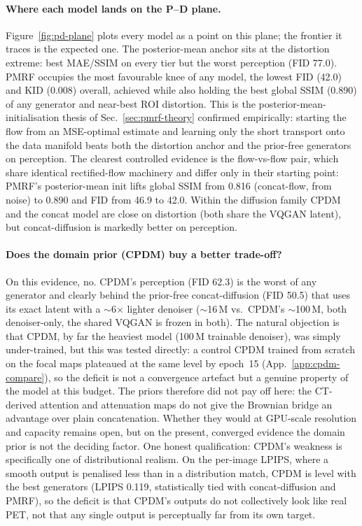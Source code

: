 \documentclass[11pt,a4paper]{article}
\newcommand{\num}[1]{#1}
\begin{document}
\paragraph{Where each model lands on the P--D plane.} Figure~\ref{fig:pd-plane} plots every model
as a point on this plane; the frontier it traces is the expected one.
The posterior-mean anchor sits at the distortion extreme: best MAE/SSIM on every tier but the
worst perception (FID \num{77.0}). PMRF occupies the most favourable knee of any
model, the lowest FID (\num{42.0}) and KID (\num{0.008}) overall, achieved while also holding
the best global SSIM (\num{0.890}) of any generator and near-best ROI distortion. This is
the posterior-mean-initialisation thesis of Sec.~\ref{sec:pmrf-theory} confirmed empirically:
starting the flow from an MSE-optimal estimate and learning only the short transport onto the
data manifold beats both the distortion anchor and the prior-free generators on perception. The
clearest controlled evidence is the flow-vs-flow pair, which share identical rectified-flow
machinery and differ only in their starting point: PMRF's posterior-mean init lifts
global SSIM from \num{0.816} (concat-flow, from noise) to \num{0.890} and FID from \num{46.9}
to \num{42.0}. Within the diffusion family CPDM and the concat model are close on distortion
(both share the VQGAN latent), but concat-diffusion is markedly better on perception.

\paragraph{Does the domain prior (CPDM) buy a better trade-off?} On this evidence, no.
CPDM's perception (FID \num{62.3}) is the worst of any generator and clearly behind the
prior-free concat-diffusion (FID \num{50.5}) that uses its exact latent with a $\sim$6$\times$
lighter denoiser ($\sim$16\,M vs.\ CPDM's $\sim$100\,M, both denoiser-only, the shared VQGAN is
frozen in both). The natural objection is that CPDM, by far the heaviest model (\num{100}\,M
trainable denoiser), was simply under-trained, but this was tested directly: a control CPDM trained from
scratch on the focal maps plateaued at the same level by epoch~15 (App.~\ref{app:cpdm-compare}),
so the deficit is not a convergence artefact but a genuine property of the model at this
budget. The priors therefore did not pay off here: the CT-derived attention and attenuation
maps do not give the Brownian bridge an advantage over plain concatenation. Whether they would
at GPU-scale resolution and capacity remains open, but on the present, converged evidence the
domain prior is not the deciding factor. One honest qualification: CPDM's weakness is specifically
one of distributional realism. On the per-image LPIPS, where a smooth output is penalised
less than in a distribution match, CPDM is level with the best generators (LPIPS \num{0.119},
statistically tied with concat-diffusion and PMRF), so the deficit is that CPDM's outputs do not
collectively look like real PET, not that any single output is perceptually far from its own
target.
\end{document}
